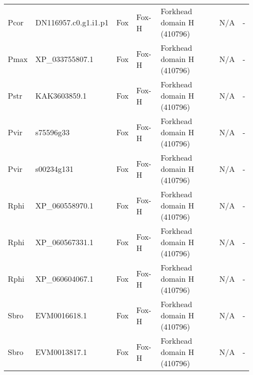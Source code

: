 \documentclass[../main.tex]{subfiles}
\begin{document}
\begin{landscape}
\begin{longtable}{lllllll}
		Pcor           & DN116957.c0.g1.i1.p1  & Fox            & Fox-H               & Forkhead domain H (410796)                  & N/A                                                                    & -                    \\
		Pmax           & XP\_033755807.1       & Fox            & Fox-H               & Forkhead domain H (410796)                  & N/A                                                                    & -                    \\
		Pstr           & KAK3603859.1          & Fox            & Fox-H               & Forkhead domain H (410796)                  & N/A                                                                    & -                    \\
		Pvir           & s75596g33             & Fox            & Fox-H               & Forkhead domain H (410796)                  & N/A                                                                    & -                    \\
		Pvir           & s00234g131            & Fox            & Fox-H               & Forkhead domain H (410796)                  & N/A                                                                    & -                    \\
		Rphi           & XP\_060558970.1       & Fox            & Fox-H               & Forkhead domain H (410796)                  & N/A                                                                    & -                    \\
		Rphi           & XP\_060567331.1       & Fox            & Fox-H               & Forkhead domain H (410796)                  & N/A                                                                    & -                    \\
		Rphi           & XP\_060604067.1       & Fox            & Fox-H               & Forkhead domain H (410796)                  & N/A                                                                    & -                    \\
		Sbro           & EVM0016618.1          & Fox            & Fox-H               & Forkhead domain H (410796)                  & N/A                                                                    & -                    \\
		Sbro           & EVM0013817.1          & Fox            & Fox-H               & Forkhead domain H (410796)                  & N/A                                                                    & -                    \\

\end{longtable}
\end{landscape}
\end{document}
